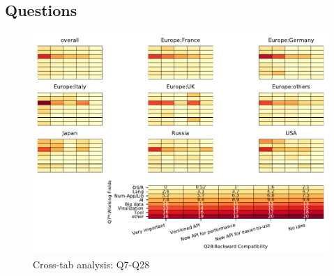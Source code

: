 
\subsection{Questions}


\begin{figure}
\begin{center}
\includegraphics[width=12cm]{../pdfs/Q7-Q28.pdf}
\caption{Cross-tab analysis: Q7-Q28}
\label{fig:Q7-Q28}
\end{center}
\end{figure}
